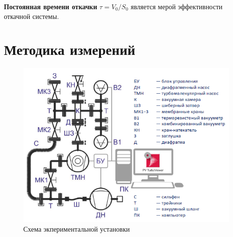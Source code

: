 \documentclass[a4paper, 12pt]{article}
\begin{document}
\textbf{Постоянная времени откачки} $\tau = V_0/S_0$ является мерой эффективности откачной системы.

\section{Методика измерений}

\begin{figure}[h!]
	\includegraphics[width = \textwidth]{3.png}
\caption{Схема экпериментальной установки}
\label{ris3}
\end{figure}
\end{document}
